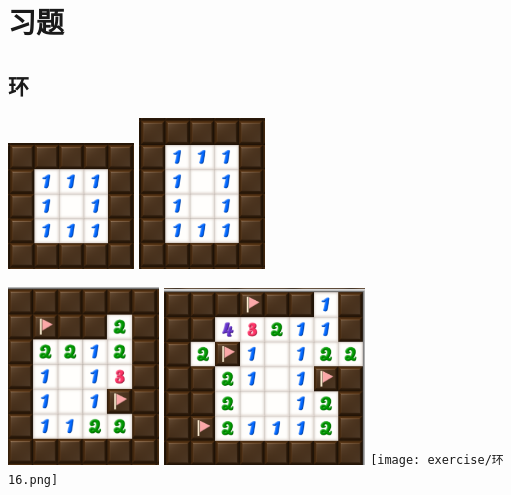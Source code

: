 \section{习题}
\subsection{环}
\begin{center}
    \includegraphics[width=0.25\textwidth]{exercise/环13.png}\quad
    \includegraphics[width=0.25\textwidth]{exercise/环15.png}
    
    \includegraphics[width=0.3\textwidth]{exercise/环10.png}\quad
    \includegraphics[width=0.4\textwidth]{exercise/环12.png}\quad
    \texttt{[image: exercise/环16.png]}
    

\end{center}
